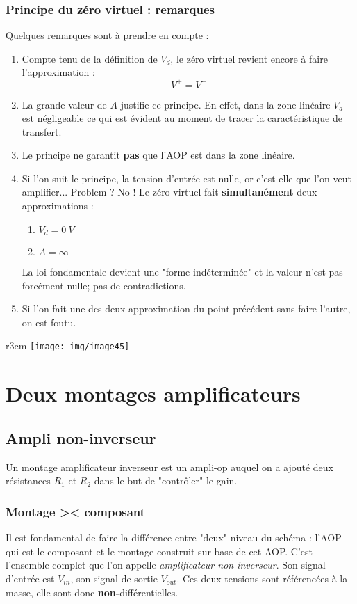 \subsubsection{Principe du zéro virtuel : remarques}
Quelques remarques sont à prendre en compte :
\begin{enumerate}
	\item Compte tenu de la définition de $V_d$, le zéro virtuel revient encore à faire l'approximation :
	      \begin{equation}
	      	V^+ = V^-
	      \end{equation}
	\item La grande valeur de $A$ justifie ce principe. En effet, dans la zone linéaire $V_d$ est négligeable ce qui est évident au moment de tracer la caractéristique de transfert.
	\item Le principe ne garantit \textbf{pas} que l'AOP est dans la zone linéaire.
	\item Si l'on suit le principe, la tension d'entrée est nulle, or c'est elle que l'on veut amplifier... Problem ? No ! Le zéro virtuel fait \textbf{simultanément} deux approximations :
	      \begin{enumerate}
	      	\item $V_d = 0\ V$
	      	\item $A = \infty$
	      \end{enumerate}
	      La loi fondamentale devient une "forme indéterminée" et la valeur n'est pas forcément nulle; pas de contradictions.
	\item Si l'on fait une des deux approximation du point précédent sans faire l'autre, on est foutu.
\end{enumerate}

\begin{wrapfigure}[9]{r}{3cm}
	\texttt{[image: img/image45]}
\end{wrapfigure}
\section{Deux montages amplificateurs}
\subsection{Ampli non-inverseur}
Un montage amplificateur inverseur est un ampli-op auquel on a ajouté deux résistances $R_1$ et $R_2$ dans le but de "contrôler" le gain. 

\subsubsection{Montage >< composant}
Il est fondamental de faire la différence entre "deux" niveau du schéma : l'AOP qui est le composant et le montage construit sur base de cet AOP. C'est l'ensemble complet que l'on appelle \textit{amplificateur non-inverseur}. Son signal d'entrée est $V_{in}$, son signal de sortie $V_{out}$. Ces deux tensions sont référencées à la masse, elle sont donc \textbf{non-}différentielles.\\

